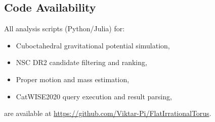 \documentclass[11pt,a4paper]{article}
\theoremstyle{remark}
\begin{document}
\subsection{Code Availability}

All analysis scripts (Python/Julia) for:
\begin{itemize}
    \item Cuboctahedral gravitational potential simulation,
    \item NSC DR2 candidate filtering and ranking,
    \item Proper motion and mass estimation,
    \item CatWISE2020 query execution and result parsing,
\end{itemize}
are available at \url{https://github.com/Viktar-Pi/FlatIrrationalTorus}.
\end{document}
